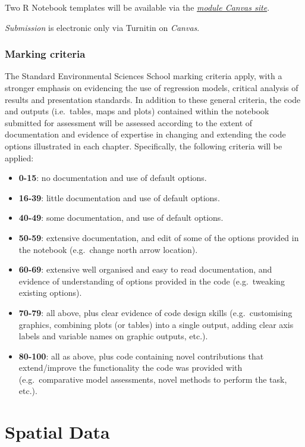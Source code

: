 \documentclass[
]{book}
\providecommand{\tightlist}{%
  \setlength{\itemsep}{0pt}\setlength{\parskip}{0pt}}
\begin{document}
Two R Notebook templates will be available via the \href{https://liverpool.instructure.com}{\emph{module Canvas site}}.

\emph{Submission} is electronic only via Turnitin on \emph{Canvas}.

\hypertarget{marking-criteria}{%
\subsection{Marking criteria}\label{marking-criteria}}

The Standard Environmental Sciences School marking criteria apply, with a stronger emphasis on evidencing the use of regression models, critical analysis of results and presentation standards. In addition to these general criteria, the code and outputs (i.e.~tables, maps and plots) contained within the notebook submitted for assessment will be assessed according to the extent of documentation and evidence of expertise in changing and extending the code options illustrated in each chapter. Specifically, the following criteria will be applied:

\begin{itemize}
\tightlist
\item
  \textbf{0-15}: no documentation and use of default options.
\item
  \textbf{16-39}: little documentation and use of default options.
\item
  \textbf{40-49}: some documentation, and use of default options.
\item
  \textbf{50-59}: extensive documentation, and edit of some of the options provided in the notebook (e.g.~change north arrow location).
\item
  \textbf{60-69}: extensive well organised and easy to read documentation, and evidence of understanding of options provided in the code (e.g.~tweaking existing options).
\item
  \textbf{70-79}: all above, plus clear evidence of code design skills (e.g.~customising graphics, combining plots (or tables) into a single output, adding clear axis labels and variable names on graphic outputs, etc.).
\item
  \textbf{80-100}: all as above, plus code containing novel contributions that extend/improve the functionality the code was provided with (e.g.~comparative model assessments, novel methods to perform the task, etc.).
\end{itemize}

\hypertarget{spatial_data}{%
\chapter{Spatial Data}\label{spatial_data}}
\end{document}
